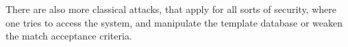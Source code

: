 \documentclass{article}
\begin{document}
There are also more classical attacks, that apply for all sorts of security, where one tries to access the system, and manipulate the template database or weaken the match acceptance criteria.

\newpage

\nocite{*}



\end{document}
